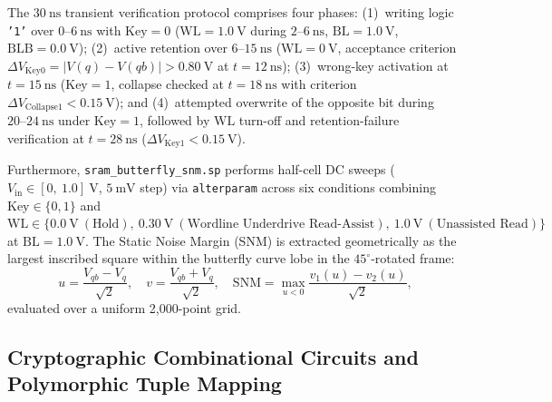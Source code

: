 The $30\ \text{ns}$ transient verification protocol comprises four phases: (1)~writing logic \texttt{'1'} over $0\text{--}6\ \text{ns}$ with $\text{Key}=0$ ($\mathrm{WL}=1.0\ \text{V}$ during $2\text{--}6\ \text{ns}$, $\mathrm{BL}=1.0\ \text{V}$, $\mathrm{BLB}=0.0\ \text{V}$); (2)~active retention over $6\text{--}15\ \text{ns}$ ($\mathrm{WL}=0\ \text{V}$, acceptance criterion $\Delta V_{\mathrm{Key0}} = |V(q)-V(qb)| > 0.80\ \text{V}$ at $t=12\ \text{ns}$); (3)~wrong-key activation at $t=15\ \text{ns}$ ($\text{Key}=1$, collapse checked at $t=18\ \text{ns}$ with criterion $\Delta V_{\mathrm{Collapse1}} < 0.15\ \text{V}$); and (4)~attempted overwrite of the opposite bit during $20\text{--}24\ \text{ns}$ under $\text{Key}=1$, followed by $\mathrm{WL}$ turn-off and retention-failure verification at $t=28\ \text{ns}$ ($\Delta V_{\mathrm{Key1}} < 0.15\ \text{V}$).

Furthermore, \texttt{sram\_\allowbreak butterfly\_\allowbreak snm.sp} performs half-cell DC sweeps ($V_{\mathrm{in}} \in [0,\ 1.0]\ \text{V}$, $5\ \text{mV}$ step) via \texttt{alterparam} across six conditions combining $\text{Key} \in \{0, 1\}$ and $\mathrm{WL} \in \{0.0\ \text{V}\ (\text{Hold}),\allowbreak\ 0.30\ \text{V}\ (\text{Wordline Underdrive Read-Assist}),\allowbreak\ 1.0\ \text{V}\ (\text{Unassisted Read})\}$ at $\mathrm{BL}=1.0\ \text{V}$. The Static Noise Margin (SNM) is extracted geometrically as the largest inscribed square within the butterfly curve lobe in the $45^\circ$-rotated frame:
\begin{equation}\label{eq:snm_45}
u = \frac{V_{qb} - V_q}{\sqrt{2}}, \quad v = \frac{V_{qb} + V_q}{\sqrt{2}}, \quad \mathrm{SNM} = \max_{u < 0} \frac{v_1(u) - v_2(u)}{\sqrt{2}},
\end{equation}
evaluated over a uniform 2,000-point grid.

\subsection{Cryptographic Combinational Circuits and Polymorphic Tuple Mapping}\label{sec:met_comb_tuples}

